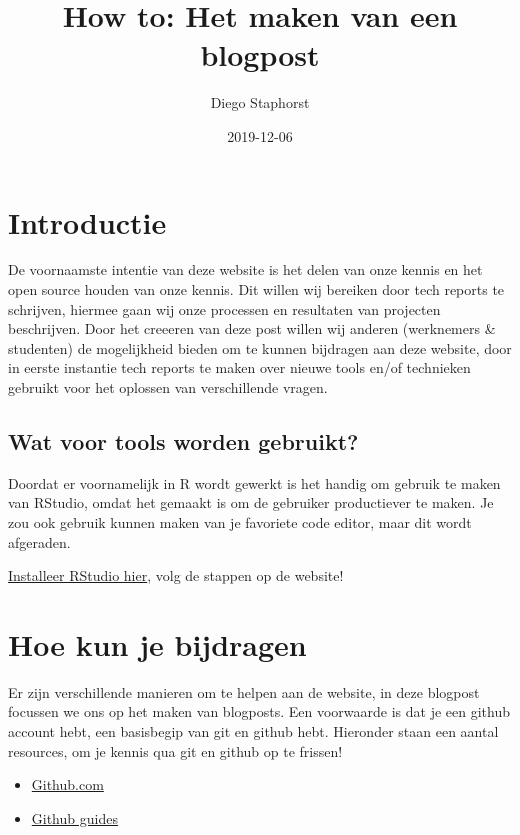 \documentclass[]{article}
\title{How to: Het maken van een blogpost}
\author{Diego Staphorst}
\date{2019-12-06}
\providecommand{\tightlist}{%
  \setlength{\itemsep}{0pt}\setlength{\parskip}{0pt}}
\begin{document}
\maketitle

\hypertarget{introductie}{%
\section{Introductie}\label{introductie}}

De voornaamste intentie van deze website is het delen van onze kennis en
het open source houden van onze kennis. Dit willen wij bereiken door
tech reports te schrijven, hiermee gaan wij onze processen en resultaten
van projecten beschrijven. Door het creeeren van deze post willen wij
anderen (werknemers \& studenten) de mogelijkheid bieden om te kunnen
bijdragen aan deze website, door in eerste instantie tech reports te
maken over nieuwe tools en/of technieken gebruikt voor het oplossen van
verschillende vragen.

\hypertarget{wat-voor-tools-worden-gebruikt}{%
\subsection{Wat voor tools worden
gebruikt?}\label{wat-voor-tools-worden-gebruikt}}

Doordat er voornamelijk in R wordt gewerkt is het handig om gebruik te
maken van RStudio, omdat het gemaakt is om de gebruiker productiever te
maken. Je zou ook gebruik kunnen maken van je favoriete code editor,
maar dit wordt afgeraden.

\href{https://rstudio.com/products/rstudio/download/}{Installeer RStudio
hier}, volg de stappen op de website!

\hypertarget{hoe-kun-je-bijdragen}{%
\section{Hoe kun je bijdragen}\label{hoe-kun-je-bijdragen}}

Er zijn verschillende manieren om te helpen aan de website, in deze
blogpost focussen we ons op het maken van blogposts. Een voorwaarde is
dat je een github account hebt, een basisbegip van git en github hebt.
Hieronder staan een aantal resources, om je kennis qua git en github op
te frissen!

\begin{itemize}
\tightlist
\item
  \href{https://github.com}{Github.com}
\item
  \href{https://guides.github.com/}{Github guides}
\end{itemize}
\end{document}
